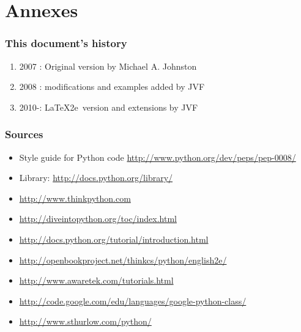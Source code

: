 \documentclass{beamer}
\begin{document}
\section{Annexes}

\begin{frame}
\frametitle{This document's history}
\begin{enumerate}
\item 2007 : Original version by Michael A. Johnston
\item 2008 : modifications and examples added by JVF
\item 2010-: \LaTeX2e\ version and extensions by JVF
\end{enumerate}
\end{frame}

\begin{frame}
\frametitle{Sources}
\small
\begin{itemize}
\item Style guide for Python code \url{http://www.python.org/dev/peps/pep-0008/}
\item Library: \url{http://docs.python.org/library/}
\item \url{http://www.thinkpython.com}
\item \url{http://diveintopython.org/toc/index.html}
\item \url{http://docs.python.org/tutorial/introduction.html}
\item \url{http://openbookproject.net/thinkcs/python/english2e/}
\item \url{http://www.awaretek.com/tutorials.html}
\item \url{http://code.google.com/edu/languages/google-python-class/}
\item \url{http://www.sthurlow.com/python/}
\end{itemize}
\normalsize
\end{frame}
\end{document}
